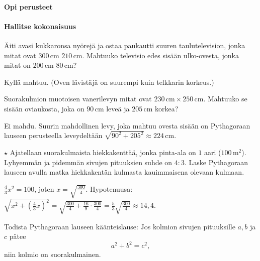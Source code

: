 \begin{tehtavasivu}

\paragraph*{Opi perusteet}

\paragraph*{Hallitse kokonaisuus}

	\begin{tehtava}
Äiti avasi kukkaronsa nyörejä ja ostaa paukautti suuren taulutelevision, jonka mitat ovat $300$\,cm \times $210$\,cm. Mahtuuko televisio edes sisään ulko-ovesta, jonka mitat on $200$\,cm \times $80$\,cm?
	\begin{vastaus}
	 Kyllä mahtuu. (Oven lävistäjä on suurempi kuin telkkarin korkeus.)
	\end{vastaus}
	\end{tehtava}
	
	\begin{tehtava}
Suorakulmion muotoisen vanerilevyn mitat ovat $230\,\text{cm}\times 250\,\text{cm}$. Mahtuuko se sisään oviaukosta, joka on $90$\,cm leveä ja $205$\,cm korkea?
        \begin{vastaus}
        Ei mahdu. Suurin mahdollinen levy, joka mahtuu ovesta sisään on Pythagoraan lauseen perusteella leveydeltään $\sqrt{90^2+205^2}\approx 224$\,cm.
        \end{vastaus}
\end{tehtava}

\begin{tehtava}
$\star$ Ajatellaan suorakulmaista hiekkakenttää, jonka pinta-ala on $1$ aari ($100\,\mathrm{m}^2$). Lyhyemmän ja pidemmän sivujen pituuksien suhde on $4:3$. Laske Pythagoraan lauseen avulla matka hiekkakentän kulmasta kauimmaisena olevaan kulmaan.
\begin{vastaus}
$\frac{4}{3}x^2=100$, joten $x = \sqrt{\frac{300}{4}}$. 
Hypotenuusa: $\sqrt{x^2 + (\frac{4}{3}x)^2}=\sqrt{\frac{300}{4}+\frac{16}{9}\cdot \frac{300}{4}}
=\frac{5}{3}\sqrt{\frac{300}{4}}\approx 14,4$.
\end{vastaus}
\end{tehtava}

\begin{tehtava}
Todista Pythagoraan lauseen käänteislause: Jos kolmion sivujen pituuksille $a,b$ ja $c$ pätee
\[
a^2+b^2 = c^2,
\]
niin kolmio on suorakulmainen.


\end{tehtava}
\end{tehtavasivu}
